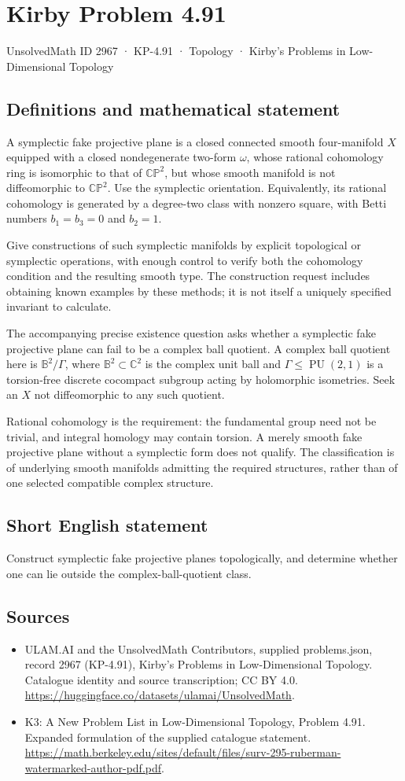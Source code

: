 \documentclass[11pt,a4paper]{article}
\begin{document}
\section*{Kirby Problem 4.91}\label{2967}
{\small UnsolvedMath ID 2967 · KP-4.91 · Topology · Kirby's Problems in Low-Dimensional Topology}
\subsection{Definitions and mathematical statement}
A symplectic fake projective plane is a closed connected smooth four-manifold $X$ equipped with a closed nondegenerate two-form $\omega$, whose rational cohomology ring is isomorphic to that of $\mathbb{CP}^2$, but whose smooth manifold is not diffeomorphic to $\mathbb{CP}^2$. Use the symplectic orientation. Equivalently, its rational cohomology is generated by a degree-two class with nonzero square, with Betti numbers $b_1=b_3=0$ and $b_2=1$.

Give constructions of such symplectic manifolds by explicit topological or symplectic operations, with enough control to verify both the cohomology condition and the resulting smooth type. The construction request includes obtaining known examples by these methods; it is not itself a uniquely specified invariant to calculate.

The accompanying precise existence question asks whether a symplectic fake projective plane can fail to be a complex ball quotient. A complex ball quotient here is $\mathbb B^2/\Gamma$, where $\mathbb B^2\subset\mathbb C^2$ is the complex unit ball and $\Gamma\le\operatorname{PU}(2,1)$ is a torsion-free discrete cocompact subgroup acting by holomorphic isometries. Seek an $X$ not diffeomorphic to any such quotient.

Rational cohomology is the requirement: the fundamental group need not be trivial, and integral homology may contain torsion. A merely smooth fake projective plane without a symplectic form does not qualify. The classification is of underlying smooth manifolds admitting the required structures, rather than of one selected compatible complex structure.
\subsection{Short English statement}
Construct symplectic fake projective planes topologically, and determine whether one can lie outside the complex-ball-quotient class.
\subsection{Sources}
\begin{itemize}
\item[S1] ULAM.AI and the UnsolvedMath Contributors, supplied problems.json, record 2967 (KP-4.91), Kirby's Problems in Low-Dimensional Topology. Catalogue identity and source transcription; CC BY 4.0.
\url{https://huggingface.co/datasets/ulamai/UnsolvedMath}.
\item[S2] K3: A New Problem List in Low-Dimensional Topology, Problem 4.91. Expanded formulation of the supplied catalogue statement.
\url{https://math.berkeley.edu/sites/default/files/surv-295-ruberman-watermarked-author-pdf.pdf}.
\end{itemize}
\end{document}
